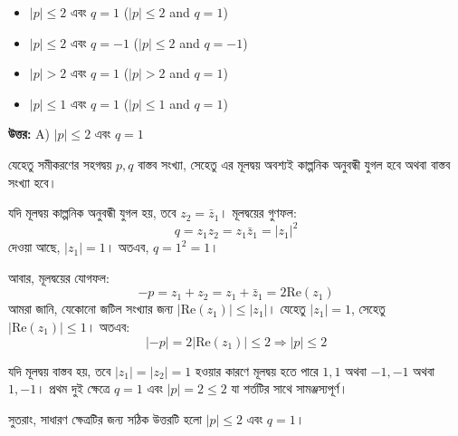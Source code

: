 \documentclass[12pt, a4paper]{article}
\begin{document}
\begin{itemize}[label={}, leftmargin=1cm, itemsep=0.5em]
    \item[\textbf{A)}] $|p| \leq 2$ এবং $q = 1$ ($|p| \leq 2$ and $q = 1$)
    \item[\textbf{B)}] $|p| \leq 2$ এবং $q = -1$ ($|p| \leq 2$ and $q = -1$)
    \item[\textbf{C)}] $|p| > 2$ এবং $q = 1$ ($|p| > 2$ and $q = 1$)
    \item[\textbf{D)}] $|p| \leq 1$ এবং $q = 1$ ($|p| \leq 1$ and $q = 1$)
\end{itemize}

\vspace{0.5em}
\begin{tcolorbox}[answerbox]
    \textbf{\color{success} উত্তর:} A) $|p| \leq 2$ এবং $q = 1$
\end{tcolorbox}
\vspace{1em}

\begin{tcolorbox}[solutionbox={সমাধান (Solution)}]
    \noindent
    যেহেতু সমীকরণের সহগদ্বয় $p, q$ বাস্তব সংখ্যা, সেহেতু এর মূলদ্বয় অবশ্যই কাল্পনিক অনুবন্ধী যুগল হবে অথবা বাস্তব সংখ্যা হবে। 
    
    যদি মূলদ্বয় কাল্পনিক অনুবন্ধী যুগল হয়, তবে $z_2 = \bar{z}_1$। মূলদ্বয়ের গুণফল:
    \[ q = z_1 z_2 = z_1 \bar{z}_1 = |z_1|^2 \]
    দেওয়া আছে, $|z_1| = 1$। অতএব, $q = 1^2 = 1$। 
    
    আবার, মূলদ্বয়ের যোগফল:
    \[ -p = z_1 + z_2 = z_1 + \bar{z}_1 = 2 \text{Re}(z_1) \]
    আমরা জানি, যেকোনো জটিল সংখ্যার জন্য $|\text{Re}(z_1)| \leq |z_1|$। যেহেতু $|z_1| = 1$, সেহেতু $|\text{Re}(z_1)| \leq 1$। অতএব:
    \[ |-p| = 2 |\text{Re}(z_1)| \leq 2 \Rightarrow |p| \leq 2 \]
    
    যদি মূলদ্বয় বাস্তব হয়, তবে $|z_1| = |z_2| = 1$ হওয়ার কারণে মূলদ্বয় হতে পারে $1, 1$ অথবা $-1, -1$ অথবা $1, -1$। প্রথম দুই ক্ষেত্রে $q = 1$ এবং $|p| = 2 \leq 2$ যা শর্তটির সাথে সামঞ্জস্যপূর্ণ। 
    
    সুতরাং, সাধারণ ক্ষেত্রটির জন্য সঠিক উত্তরটি হলো $|p| \leq 2$ এবং $q = 1$।
\end{tcolorbox}

\vspace{1em}
\end{document}
